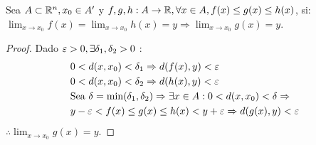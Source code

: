 \begin{theorem}
  Sea \(A \subset \mathbb{R}^n, x_0 \in A^{\prime}\) y \(f, g, h: A \to \mathbb{R}, \forall x \in A, f(x) \leq g(x) \leq h(x)\), si: \\
  \(\lim_{x \to x_0} f(x) = \lim_{x \to x_0} h(x) = y \Rightarrow \lim_{x \to x_0} g(x) = y\).
  \begin{proof}
    Dado \(\varepsilon > 0, \exists \delta_1, \delta_2 > 0\) :
    \begin{align*}
       & 0 < d(x, x_0) < \delta_1 \Rightarrow d(f(x), y) < \varepsilon                                                                 \\
       & 0 < d(x, x_0) < \delta_2 \Rightarrow d(h(x), y) < \varepsilon                                                                 \\
       & \text{Sea } \delta = \text{min}(\delta_1, \delta_2) \Rightarrow \exists x \in A : 0 < d(x, x_0) < \delta \Rightarrow \\
       & y - \varepsilon < f(x) \leq g(x) \leq h(x) < y + \varepsilon \Rightarrow d(g(x), y) < \varepsilon
    \end{align*}
    \(\therefore \lim_{x \to x_0} g(x) = y\).
  \end{proof}
\end{theorem}
